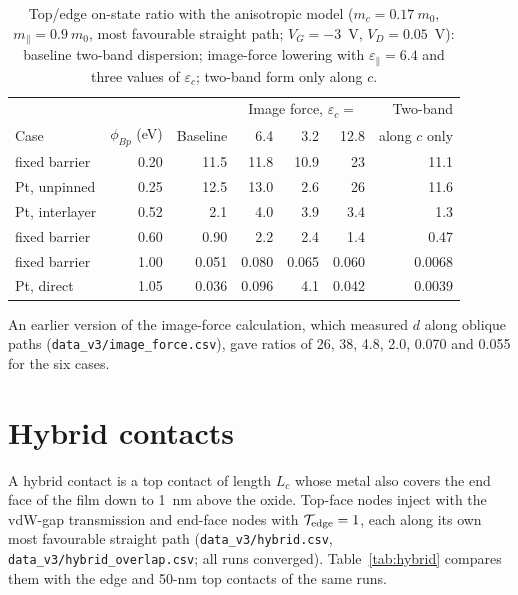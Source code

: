 \documentclass[11pt]{article}
\begin{document}
\begin{table}[!htbp]
\centering
\caption{Top/edge on-state ratio with the anisotropic model ($m_c=0.17~m_0$, $m_\parallel=0.9~m_0$, most favourable straight path; $V_G=-3$~V, $V_D=0.05$~V): baseline two-band dispersion; image-force lowering with $\varepsilon_\parallel=6.4$ and three values of $\varepsilon_c$; two-band form only along $c$.}
\label{tab:physsens}\footnotesize\setlength{\tabcolsep}{4pt}
\begin{tabular}{lrrrrrr}
\toprule
 & & & \multicolumn{3}{c}{Image force, $\varepsilon_c=$} & Two-band \\
Case & $\phi_{Bp}$ (eV) & Baseline & 6.4 & 3.2 & 12.8 & along $c$ only \\
\midrule
fixed barrier & 0.20 & 11.5 & 11.8 & 10.9 & 23 & 11.1 \\
Pt, unpinned & 0.25 & 12.5 & 13.0 & 2.6 & 26 & 11.6 \\
Pt, interlayer & 0.52 & 2.1 & 4.0 & 3.9 & 3.4 & 1.3 \\
fixed barrier & 0.60 & 0.90 & 2.2 & 2.4 & 1.4 & 0.47 \\
fixed barrier & 1.00 & 0.051 & 0.080 & 0.065 & 0.060 & 0.0068 \\
Pt, direct & 1.05 & 0.036 & 0.096 & 4.1 & 0.042 & 0.0039 \\
\bottomrule
\end{tabular}
\end{table}

An earlier version of the image-force calculation, which measured $d$ along oblique paths (\texttt{data\_v3/image\_force.csv}), gave ratios of 26, 38, 4.8, 2.0, 0.070 and 0.055 for the six cases.

\section{Hybrid contacts}
\label{sec:hybrid}
A hybrid contact is a top contact of length $L_c$ whose metal also covers the end face of the film down to 1~nm above the oxide. Top-face nodes inject with the vdW-gap transmission and end-face nodes with $\mathcal{T}_{\rm edge}=1$, each along its own most favourable straight path (\texttt{data\_v3/hybrid.csv}, \texttt{data\_v3/hybrid\_overlap.csv}; all runs converged). Table~\ref{tab:hybrid} compares them with the edge and 50-nm top contacts of the same runs.
\end{document}
